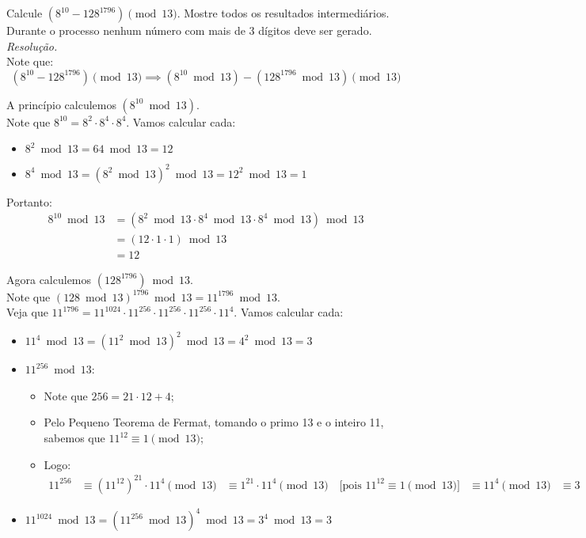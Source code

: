 Calcule $(8^{10} - 128^{1796}) \pmod{13}$. Mostre todos os resultados intermediários. Durante o processo nenhum número com mais de 3 dígitos deve ser gerado. \\
\emph{Resolução.} \\
Note que:
\begin{displaymath}
	(8^{10} - 128^{1796}) \pmod{13} \implies (8^{10} \bmod{13}) - (128^{1796} \bmod{13}) \pmod{13}
\end{displaymath}

A princípio calculemos $(8^{10} \bmod{13})$. \\
Note que $8^10 = 8^2 \cdot 8^4 \cdot 8^4$. Vamos calcular cada:
\begin{itemize}
	\item $8^2 \bmod{13} = 64 \bmod{13} = 12$ 
	\item $8^4 \bmod{13} = (8^2 \bmod{13})^2 \bmod{13} = 12^2 \bmod{13} = 1$ 
\end{itemize}
Portanto:
\begin{align*}
	8^{10} \bmod{13} &= (8^2 \bmod{13} \cdot 8^4 \bmod{13} \cdot 8^4 \bmod{13}) \bmod{13} \\
	&= (12 \cdot 1 \cdot 1) \bmod{13} \\
	&= 12
\end{align*}

Agora calculemos $(128^{1796}) \bmod{13}$. \\
Note que $(128 \bmod{13})^{1796} \bmod{13} = 11^{1796} \bmod{13}$. \\
Veja que $11^{1796} = 11^{1024} \cdot 11^{256} \cdot 11^{256} \cdot 11^{256} \cdot 11^4$.
Vamos calcular cada:
\begin{itemize}
	\item $11^4 \bmod{13} = (11^2 \bmod{13})^2 \bmod{13} = 4^2 \bmod{13} = 3$
	\item $11^{256} \bmod{13}$:
	\begin{itemize}
		\item Note que $256 = 21 \cdot 12 + 4$;
		\item Pelo Pequeno Teorema de Fermat, tomando o primo 13 e o inteiro 11, sabemos que $11^{12} \equiv 1 \pmod{13}$;
		\item Logo:
			\begin{align*}
				11^{256} &\equiv (11^{12})^{21} \cdot 11^4 \pmod{13}
					&\equiv 1^{21} \cdot 11^4 \pmod{13} \quad \text{[pois $11^{12} \equiv 1 \pmod{13}$]}
					&\equiv 11^4 \pmod{13} 
					&\equiv 3 
			\end{align*}
	\end{itemize}
	\item $11^{1024} \bmod{13} = (11^{256} \bmod{13})^4 \bmod{13} = 3^4 \bmod{13} = 3$
\end{itemize}

